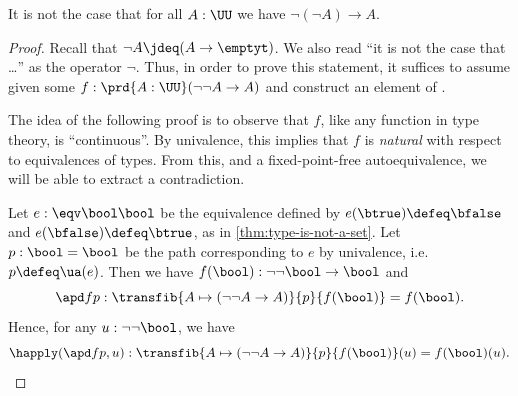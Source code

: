 \begin{thm}\label{thm:not-dneg}
  It is not the case that for all $A:\UU$ we have $\neg(\neg A) \to A$.
\end{thm}
\begin{proof}
  Recall that $\neg A \jdeq (A\to\emptyt)$.
  We also read ``it is not the case that \dots'' as the operator $\neg$.
  Thus, in order to prove this statement, it suffices to assume given some $f:\prd{A:\UU} (\neg\neg A \to A)$ and construct an element of \emptyt.

  The idea of the following proof is to observe that $f$, like any function in type theory, is ``continuous''.
  By univalence, this implies that $f$ is \emph{natural} with respect to equivalences of types.
  From this, and a fixed-point-free autoequivalence, we will be able to extract a contradiction.

  Let $e:\eqv\bool\bool$ be the equivalence defined by $e(\btrue)\defeq\bfalse$ and $e(\bfalse)\defeq\btrue$, as in \cref{thm:type-is-not-a-set}.
  Let $p:\bool=\bool$ be the path corresponding to $e$ by univalence, i.e.\ $p\defeq \ua(e)$.
  Then we have $f(\bool) : \neg\neg\bool \to\bool$ and
  \[\apd f p : \transfib{A\mapsto (\neg\neg A \to A)}{p}{f(\bool)} = f(\bool).\]
  Hence, for any $u:\neg\neg\bool$, we have
  \[\happly(\apd f p,u) : \transfib{A\mapsto (\neg\neg A \to A)}{p}{f(\bool)}(u) = f(\bool)(u).\]


\end{proof}
